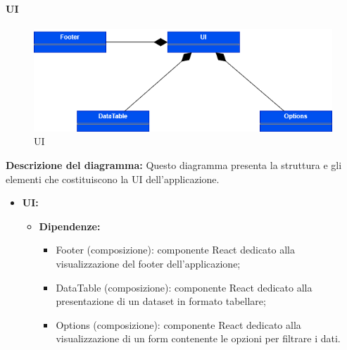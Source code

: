 \paragraph{UI}
\begin{figure}[h!] \centering
    \includegraphics[scale=0.45]{template/images/uml_front/ui/ui.png}
    \caption{UI}
\end{figure}
\textbf{Descrizione del diagramma:}
Questo diagramma presenta la struttura e gli elementi che costituiscono la UI dell'applicazione.
\begin{itemize}
    \item \textbf{UI:}
          \begin{itemize}
              \item \textbf{Dipendenze:}
                    \begin{itemize}
                        \item Footer (composizione): componente React dedicato alla visualizzazione del
                              footer dell'applicazione;
                        \item DataTable (composizione): componente React dedicato alla presentazione di un
                              dataset in formato tabellare;
                        \item Options (composizione): componente React dedicato alla visualizzazione di
                              un form contenente le opzioni per filtrare i dati.
                    \end{itemize}
          \end{itemize}
\end{itemize}

\pagebreak

